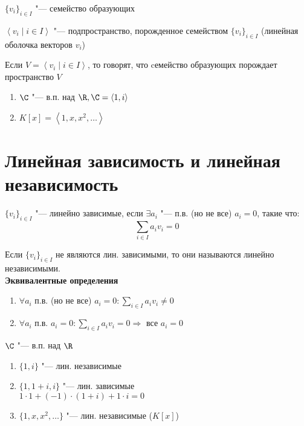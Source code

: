 \begin{Def}
	$\{ v_i \}_{i \in I}$ "--- семейство образующих 
\end{Def}

\begin{Def}
	$\left< v_i \mid i \in I \right>$ "--- подпространство, порожденное семейством $\{ v_i \}_{i \in I}$ (линейная оболочка векторов $v_i$)
\end{Def}

\begin{Def}
	Если $V = \left< v_i \mid i \in I \right>$, то говорят, что cемейство образующих порождает пространство $V$
\end{Def}

\begin{exmp}
	\begin{enumerate}
	\item
		$\C$ "--- в.п. над $\R, \C = \left< 1, i \right>$
	\item
		$K[x] = \left< 1, x, x^2, \dots \right>$
	\end{enumerate}
\end{exmp}

\section{Линейная зависимость и линейная независимость}

\begin{Def}
	$\{ v_i \}_{i \in I}$ "--- линейно зависимые, если $\exists a_i$ "--- п.в. (но не все) $a_i = 0$, такие что:
	\[\sum_{i \in I} a_iv_i = 0\]
\end{Def}

\begin{Def}
	Если $\{ v_i \}_{i \in I}$ не являются лин. зависимыми, то они называются линейно независимыми. \\
	\textbf{Эквивалентные определения}
	\begin{enumerate}
	\item
		$\forall a_i$ п.в. (но не все) $a_i = 0 \colon \sum\limits_{i \in I} a_iv_i \neq 0$
	\item
		$\forall a_i$ п.в. $a_i = 0 \colon \sum\limits_{i \in I} a_iv_i = 0 \Rightarrow$ все $a_i = 0$
	\end{enumerate}
\end{Def}

\begin{exmp}
	$\C$ "--- в.п. над $\R$
	\begin{enumerate}
	\item
		$\{1, i\}$ "--- лин. независимые
	\item
		$\{1, 1 + i, i\}$ "--- лин. зависимые \\
		$1 \cdot 1 + (-1) \cdot (1 + i) + 1 \cdot i = 0$
	\item
		$\{1, x, x^2, \dots\}$ "--- лин. независимые ($K[x]$)
	\end{enumerate}
\end{exmp}

